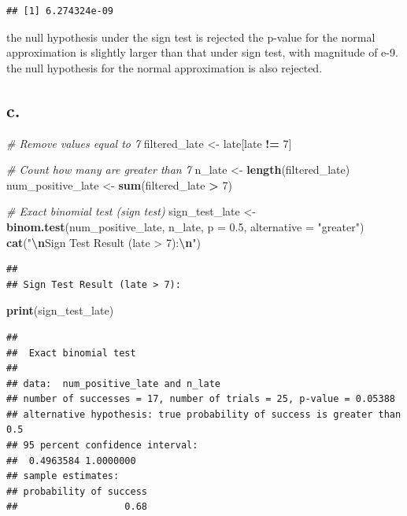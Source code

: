 \documentclass[
]{article}
\newenvironment{Shaded}{\begin{snugshade}}{\end{snugshade}}
\newcommand{\AttributeTok}[1]{\textcolor[rgb]{0.13,0.29,0.53}{#1}}
\newcommand{\CommentTok}[1]{\textcolor[rgb]{0.56,0.35,0.01}{\textit{#1}}}
\newcommand{\DecValTok}[1]{\textcolor[rgb]{0.00,0.00,0.81}{#1}}
\newcommand{\FloatTok}[1]{\textcolor[rgb]{0.00,0.00,0.81}{#1}}
\newcommand{\FunctionTok}[1]{\textcolor[rgb]{0.13,0.29,0.53}{\textbf{#1}}}
\newcommand{\NormalTok}[1]{#1}
\newcommand{\OtherTok}[1]{\textcolor[rgb]{0.56,0.35,0.01}{#1}}
\newcommand{\SpecialCharTok}[1]{\textcolor[rgb]{0.81,0.36,0.00}{\textbf{#1}}}
\newcommand{\StringTok}[1]{\textcolor[rgb]{0.31,0.60,0.02}{#1}}
\begin{document}
\begin{verbatim}
## [1] 6.274324e-09
\end{verbatim}

the null hypothesis under the sign test is rejected the p-value for the
normal approximation is slightly larger than that under sign test, with
magnitude of e-9. the null hypothesis for the normal approximation is
also rejected.

\subsection{c.}\label{c.}

\begin{Shaded}
\begin{Highlighting}[]
\CommentTok{\# Remove values equal to 7}
\NormalTok{filtered\_late }\OtherTok{\textless{}{-}}\NormalTok{ late[late }\SpecialCharTok{!=} \DecValTok{7}\NormalTok{]}

\CommentTok{\# Count how many are greater than 7}
\NormalTok{n\_late }\OtherTok{\textless{}{-}} \FunctionTok{length}\NormalTok{(filtered\_late)}
\NormalTok{num\_positive\_late }\OtherTok{\textless{}{-}} \FunctionTok{sum}\NormalTok{(filtered\_late }\SpecialCharTok{\textgreater{}} \DecValTok{7}\NormalTok{)}

\CommentTok{\# Exact binomial test (sign test)}
\NormalTok{sign\_test\_late }\OtherTok{\textless{}{-}} \FunctionTok{binom.test}\NormalTok{(num\_positive\_late, n\_late, }\AttributeTok{p =} \FloatTok{0.5}\NormalTok{, }\AttributeTok{alternative =} \StringTok{"greater"}\NormalTok{)}
\FunctionTok{cat}\NormalTok{(}\StringTok{"}\SpecialCharTok{\textbackslash{}n}\StringTok{Sign Test Result (late \textgreater{} 7):}\SpecialCharTok{\textbackslash{}n}\StringTok{"}\NormalTok{)}
\end{Highlighting}
\end{Shaded}

\begin{verbatim}
## 
## Sign Test Result (late > 7):
\end{verbatim}

\begin{Shaded}
\begin{Highlighting}[]
\FunctionTok{print}\NormalTok{(sign\_test\_late)}
\end{Highlighting}
\end{Shaded}

\begin{verbatim}
## 
##  Exact binomial test
## 
## data:  num_positive_late and n_late
## number of successes = 17, number of trials = 25, p-value = 0.05388
## alternative hypothesis: true probability of success is greater than 0.5
## 95 percent confidence interval:
##  0.4963584 1.0000000
## sample estimates:
## probability of success 
##                   0.68
\end{verbatim}
\end{document}
